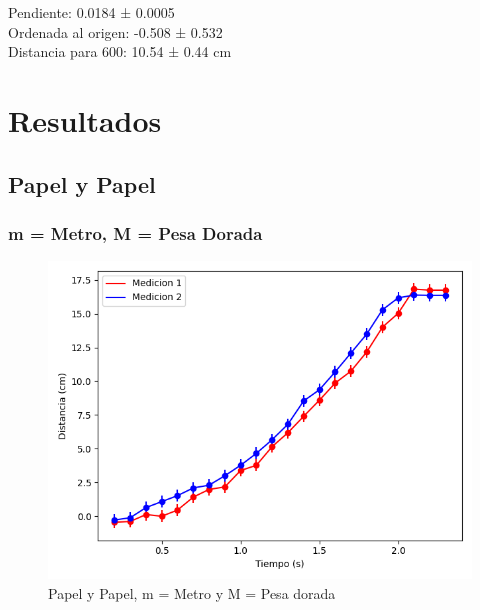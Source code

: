 \documentclass[12pt,a4]{article}
\begin{document}
Pendiente: 0.0184 ± 0.0005 \\

Ordenada al origen: -0.508 ± 0.532 \\

Distancia para 600: 10.54 ± 0.44 cm \\

\section{Resultados}

\subsection{Papel y Papel}

\subsubsection*{m = Metro, M = Pesa Dorada}

\begin{figure}[H]
    \centering
    \includegraphics[width=0.9\linewidth]{TiempoVsDistanciaPapelPapelM_O.png}
    \caption{Papel y Papel, m = Metro y M = Pesa dorada}
    \label{fig:PyPM_O}
\end{figure}
\end{document}

